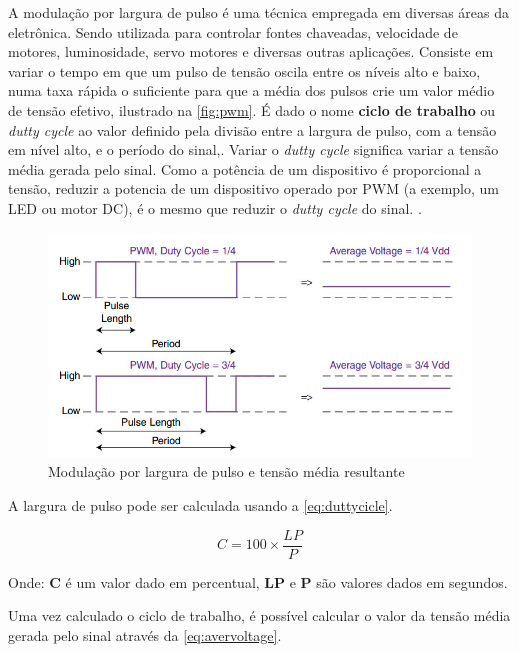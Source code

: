 A modulação por largura de pulso é uma técnica empregada em diversas áreas da eletrônica. Sendo utilizada para controlar fontes chaveadas, velocidade de motores, luminosidade, servo motores e diversas outras aplicações. Consiste em variar o tempo em que um pulso de tensão oscila entre os níveis alto e baixo, numa taxa rápida o suficiente para que a média dos pulsos crie um valor médio de tensão efetivo, ilustrado na \autoref{fig:pwm}. É dado o nome \textbf{ciclo de trabalho} ou \textit{dutty cycle} ao valor definido pela divisão entre a largura de pulso, com a tensão em nível alto, e o período do sinal,. Variar o \textit{dutty cycle} significa variar a tensão média gerada pelo sinal. Como a potência de um dispositivo é proporcional a tensão, reduzir a potencia de um dispositivo operado por PWM (a exemplo, um LED ou motor DC), é o mesmo que reduzir o \textit{dutty cycle} do sinal. .

\begin{figure}[h]
	\centering
	\includegraphics[width=1\textwidth]{figuras/pwm.jpg}
	\caption{Modulação por largura de pulso e tensão média resultante}
	\label{fig:pwm}
\end{figure}

A largura de pulso pode ser calculada usando a \autoref{eq:duttycicle}.

\begin{equation}
{C} = 100 \times \frac{LP}{P}  
\label{eq:duttycicle}
\end{equation}

Onde: \textbf{C} é um valor dado em percentual, \textbf{LP} e \textbf{P} são valores dados em segundos.\par

Uma vez calculado o ciclo de trabalho, é possível calcular o valor da tensão média gerada pelo sinal através da \autoref{eq:avervoltage}.

